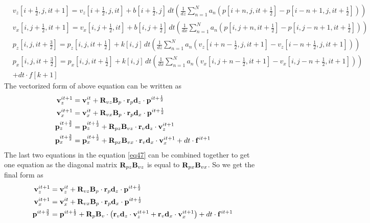 \documentclass[revised,endfloat]{geophysics}
\begin{document}
\begin{equation}
\begin{split}
& v_z[i+\frac{1}{2},j,it+1] = v_z[i+\frac{1}{2},j,it] + b[i+\frac{1}{2},j] \, dt\left(\frac{1}{dz} \sum_{n=1}^N  a_n \left( p[i+n,j,it+\frac{1}{2}] - p[i-n+1,j,it+\frac{1}{2}] \right)  \right) \\
& v_x[i,j+\frac{1}{2},it+1] = v_x[i,j+\frac{1}{2},it] + b[i,j+\frac{1}{2}] \, dt
\left( \frac{1}{dx} \sum_{n=1}^N  a_n \left( p[i,j+n,it+\frac{1}{2}] - p[i,j-n+1,it+\frac{1}{2}]\right) \right) \\
& p_z[i,j,it+\frac{3}{2}] =  p_z[i,j,it+\frac{1}{2}] + k[i,j] \, dt \left(\frac{1}{dz} \sum_{n=1}^N  a_n \left( v_z[i+n-\frac{1}{2},j,it+1] - v_z[i-n+\frac{1}{2},j,it+1] \right)  \right) \\
&p_x[i,j,it+\frac{3}{2}] =  p_x[i,j,it+\frac{1}{2}]+ k[i,j]\, dt \left(\frac{1}{dx} \sum_{n=1}^N  a_n \left(v_x[i,j+n-\frac{1}{2},it+1] - v_x[i,j-n+\frac{1}{2},it+1] \right) \right) \\
&+ dt \cdot f[k+1]   
\end{split}
\label{eq46}
\end{equation}
The vectorized form of above equation can be written as
\begin{equation}
\begin{split}
{\bf v}_z^{it+1} &= {\bf v}_z^{it} +  {\bf R}_{vz}{\bf B}_{p} \cdot {\bf r}_p{\bf d}_z \cdot {\bf p}^{it+\frac{1}{2}} \\
{\bf v}_x^{it+1} &= {\bf v}_x^{it} +  {\bf R}_{vx}{\bf B}_{p} \cdot {\bf r}_p{\bf d}_x \cdot {\bf p}^{it+\frac{1}{2}}  \\
{\bf p}_z^{it+\frac{3}{2}} &=  {\bf p}_z^{it+\frac{1}{2}} +  {\bf R}_{pz}{\bf B}_{vz} \cdot {\bf r}_v{\bf d}_z \cdot {\bf v}_z^{it+1}  \\
{\bf p}_x^{it+\frac{3}{2}} &=   {\bf p}_x^{it+\frac{1}{2}} +  {\bf R}_{px}{\bf B}_{vx} \cdot {\bf r}_v{\bf d}_x \cdot {\bf v}_x^{it+1} + dt \cdot {\bf f}^{it+1}  \\
\end{split}
\label{eq47}
\end{equation}
The last two equations in the equation \ref{eq47} can be combined together to get one equation as the diagonal matrix  ${\bf R}_{pz}{\bf B}_{vz}$ is equal to ${\bf R}_{px}{\bf B}_{vx}$. So we get the final form as
\begin{equation}
\begin{split}
{\bf v}_z^{it+1} &= {\bf v}_z^{it} +  {\bf R}_{vz}{\bf B}_{p} \cdot {\bf r}_p{\bf d}_z \cdot {\bf p}^{it+\frac{1}{2}} \\
{\bf v}_x^{it+1} &= {\bf v}_x^{it} +  {\bf R}_{vx}{\bf B}_{p} \cdot {\bf r}_p{\bf d}_x \cdot {\bf p}^{it+\frac{1}{2}}  \\
{\bf p}^{it+\frac{3}{2}} &=  {\bf p}^{it+\frac{1}{2}} +  {\bf R}_{p}{\bf B}_{v} \cdot \left( {\bf r}_v{\bf d}_z \cdot {\bf v}_z^{it+1} +  {\bf r}_v{\bf d}_x \cdot {\bf v}_x^{it+1} \right)+ dt \cdot {\bf f}^{it+1}  \\
\end{split}
\label{eq48}
\end{equation}
\end{document}
